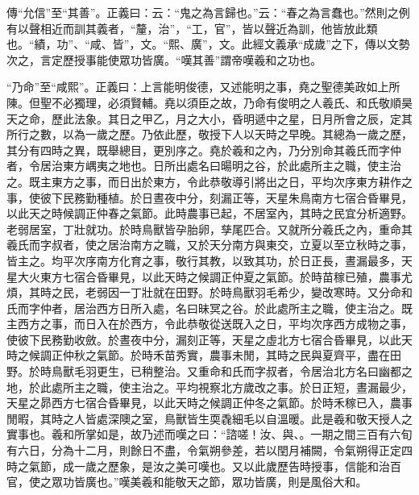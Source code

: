{\noindent\zhuan{}\fzbyks 傳“允信”至“其善”。正義曰：云：“鬼之為言歸也。”云：“春之為言蠢也。”然則之例有以聲相近而訓其義者，“釐，治”，“工，官”，皆以聲近為訓，他皆放此類也。“績，功”、“咸、皆”，文。“熙、廣”，文。此經文義承“成歲”之下，傳以文勢次之，言定歷授事能使眾功皆廣。“嘆其善”謂帝嘆羲和之功也。 \par}

{\noindent\shu{}\fzkt “乃命”至“咸熙”。正義曰：上言能明俊德，又述能明之事，堯之聖德美政如上所陳。但聖不必獨理，必須賢輔。堯以須臣之故，乃命有俊明之人羲氏、和氏敬順昊天之命，歷此法象。其日之甲乙，月之大小，昏明遞中之星，日月所會之辰，定其所行之數，以為一歲之歷。乃依此歷，敬授下人以天時之早晚。其總為一歲之歷，其分有四時之異，既舉總目，更別序之。堯於羲和之內，乃分別命其羲氏而字仲者，令居治東方嵎夷之地也。日所出處名曰暘明之谷，於此處所主之職，使主治之。既主東方之事，而日出於東方，令此恭敬導引將出之日，平均次序東方耕作之事，使彼下民務勤種植。於日晝夜中分，刻漏正等，天星朱鳥南方七宿合昏畢見，以此天之時候調正仲春之氣節。此時農事已起，不居室內，其時之民宜分析適野。老弱居室，丁壯就功。於時鳥獸皆孕胎卵，孳尾匹合。又就所分羲氏之內，重命其羲氏而字叔者，使之居治南方之職，又於天分南方與東交，立夏以至立秋時之事，皆主之。均平次序南方化育之事，敬行其教，以致其功，於日正長，晝漏最多，天星大火東方七宿合昏畢見，以此天時之候調正仲夏之氣節。於時苗稼已殖，農事尤煩，其時之民，老弱因一丁壯就在田野。於時鳥獸羽毛希少，變改寒時。又分命和氏而字仲者，居治西方日所入處，名曰昧冥之谷。於此處所主之職，使主治之。既主西方之事，而日入在於西方，令此恭敬從送既入之日，平均次序西方成物之事，使彼下民務勤收斂。於晝夜中分，漏刻正等，天星之虛北方七宿合昏畢見，以此天時之候調正仲秋之氣節。於時禾苗秀實，農事未閒，其時之民與夏齊平，盡在田野。於時鳥獸毛羽更生，已稍整治。又重命和氏而字叔者，令居治北方名曰幽都之地，於此處所主之職，使主治之。平均視察北方歲改之事。於日正短，晝漏最少，天星之昴西方七宿合昏畢見，以此天時之候調正仲冬之氣節。於時禾稼已入，農事閒暇，其時之人皆處深隩之室，鳥獸皆生耎毳細毛以自溫暖。此是羲和敬天授人之實事也。羲和所掌如是，故乃述而嘆之曰：“諮嗟！汝、與、。一期之間三百有六旬有六日，分為十二月，則餘日不盡，令氣朔參差，若以閏月補闕，令氣朔得正定四時之氣節，成一歲之歷象，是汝之美可嘆也。又以此歲歷告時授事，信能和治百官，使之眾功皆廣也。”嘆美羲和能敬天之節，眾功皆廣，則是風俗大和。 \par}

